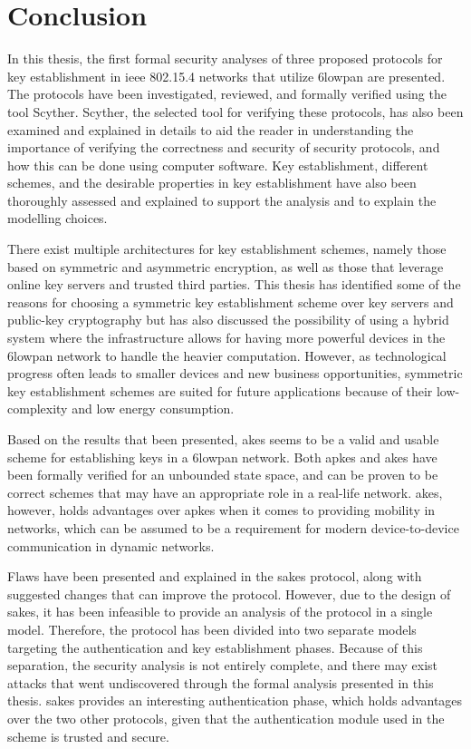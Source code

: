 \chapter{Conclusion}
\label{chp:conclusion}


In this thesis, the first formal security analyses of three proposed protocols for key establishment in \gls{ieee} 802.15.4 networks that utilize \gls{6lowpan} are presented. The protocols have been investigated, reviewed, and formally verified using the tool Scyther. Scyther, the selected tool for verifying these protocols, has also been examined and explained in details to aid the reader in understanding the importance of verifying the correctness and security of security protocols, and how this can be done using computer software. Key establishment, different schemes, and the desirable properties in key establishment have also been thoroughly assessed and explained to support the analysis and to explain the modelling choices.

There exist multiple architectures for key establishment schemes, namely those based on symmetric and asymmetric encryption, as well as those that leverage online key servers and trusted third parties. This thesis has identified some of the reasons for choosing a symmetric key establishment scheme over key servers and public-key cryptography but has also discussed the possibility of using a hybrid system where the infrastructure allows for having more powerful devices in the \gls{6lowpan} network to handle the heavier computation. However, as technological progress often leads to smaller devices and new business opportunities, symmetric key establishment schemes are suited for future applications because of their low-complexity and low energy consumption.


Based on the results that been presented, \gls{akes} seems to be a valid and usable scheme for establishing keys in a \gls{6lowpan} network. Both \gls{apkes} and \gls{akes} have been formally verified for an unbounded state space, and can be proven to be correct schemes that may have an appropriate role in a real-life network. \gls{akes}, however, holds advantages over \gls{apkes} when it comes to providing mobility in networks, which can be assumed to be a requirement for modern device-to-device communication in dynamic networks.

Flaws have been presented and explained in the \gls{sakes} protocol, along with suggested changes that can improve the protocol. However, due to the design of \gls{sakes}, it has been infeasible to provide an analysis of the protocol in a single model. Therefore, the protocol has been divided into two separate models targeting the authentication and key establishment phases. Because of this separation, the security analysis is not entirely complete, and there may exist attacks that went undiscovered through the formal analysis presented in this thesis. \gls{sakes} provides an interesting authentication phase, which holds advantages over the two other protocols, given that the authentication module used in the scheme is trusted and secure.


